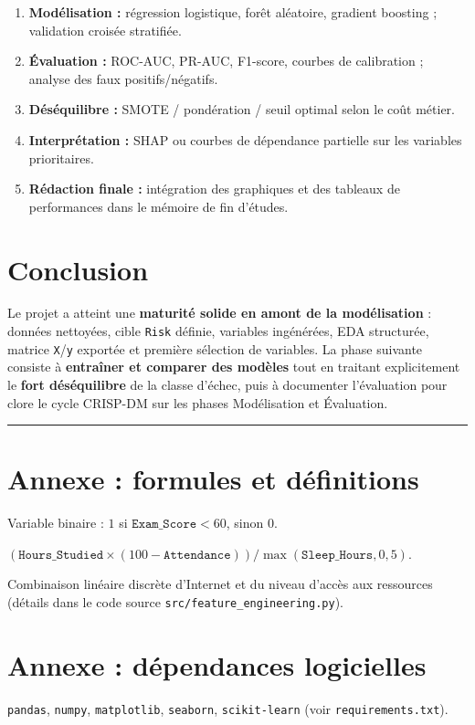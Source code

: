 \documentclass[a4paper,11pt]{article}
\begin{document}
\begin{enumerate}[leftmargin=*]
  \item \textbf{Modélisation :} régression logistique, forêt aléatoire, gradient boosting ; validation croisée stratifiée.
  \item \textbf{Évaluation :} ROC-AUC, PR-AUC, F1-score, courbes de calibration ; analyse des faux positifs/négatifs.
  \item \textbf{Déséquilibre :} SMOTE / pondération / seuil optimal selon le coût métier.
  \item \textbf{Interprétation :} SHAP ou courbes de dépendance partielle sur les variables prioritaires.
  \item \textbf{Rédaction finale :} intégration des graphiques et des tableaux de performances dans le mémoire de fin d'études.
\end{enumerate}

\section{Conclusion}

Le projet a atteint une \textbf{maturité solide en amont de la modélisation} : données nettoyées, cible \texttt{Risk} définie, variables ingénérées, EDA structurée, matrice \texttt{X}/\texttt{y} exportée et première sélection de variables. La phase suivante consiste à \textbf{entraîner et comparer des modèles} tout en traitant explicitement le \textbf{fort déséquilibre} de la classe d'échec, puis à documenter l'évaluation pour clore le cycle CRISP-DM sur les phases Modélisation et Évaluation.

\vspace{1em}
\noindent\rule{\textwidth}{0.4pt}

\appendix
\section{Annexe : formules et définitions}

\begin{description}[style=nextline]
  \item[Risk] Variable binaire : $1$ si $\texttt{Exam\_Score} < 60$, sinon $0$.
  \item[Indice de stress académique] $(\texttt{Hours\_Studied} \times (100-\texttt{Attendance}))/\max(\texttt{Sleep\_Hours},0{,}5)$.
  \item[Score d'accès numérique] Combinaison linéaire discrète d'Internet et du niveau d'accès aux ressources (détails dans le code source \texttt{src/feature\_engineering.py}).
\end{description}

\section{Annexe : dépendances logicielles}

\texttt{pandas}, \texttt{numpy}, \texttt{matplotlib}, \texttt{seaborn}, \texttt{scikit-learn} (voir \texttt{requirements.txt}).
\end{document}
